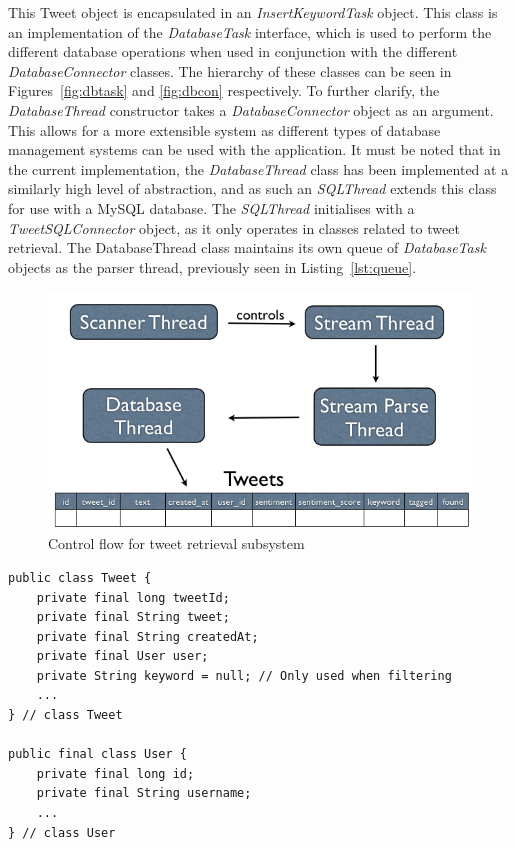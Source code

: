 This Tweet object is encapsulated in an \emph{InsertKeywordTask} object. This class is an implementation of the \emph{DatabaseTask} interface, which is used to perform the different database operations when used in conjunction with the different \emph{DatabaseConnector} classes. The hierarchy of these classes can be seen in Figures~\ref{fig:dbtask} and \ref{fig:dbcon} respectively. To further clarify, the \emph{DatabaseThread} constructor takes a \emph{DatabaseConnector} object as an argument. This allows for a more extensible system as different types of database management systems can be used with the application. It must be noted that in the current implementation, the \emph{DatabaseThread} class has been implemented at a similarly high level of abstraction, and as such an \emph{SQLThread} extends this class for use with a MySQL database. The \emph{SQLThread} initialises with a \emph{TweetSQLConnector} object, as it only operates in classes related to tweet retrieval. The DatabaseThread class maintains its own queue of \emph{DatabaseTask} objects as the parser thread, previously seen in Listing~\ref{lst:queue}.

\begin{figure}[t]
\begin{center}
\includegraphics[width=12cm]{tweetir}
\end{center}
\caption{Control flow for tweet retrieval subsystem}
\label{fig:tweetir}
\end{figure}

\begin{lstlisting}[caption=Tweet and User class properties, label=lst:tweetuser]
public class Tweet {
    private final long tweetId;
    private final String tweet;
    private final String createdAt;
    private final User user;
    private String keyword = null; // Only used when filtering
    ...
} // class Tweet

public final class User {
    private final long id;
    private final String username;
    ...
} // class User 
\end{lstlisting}

